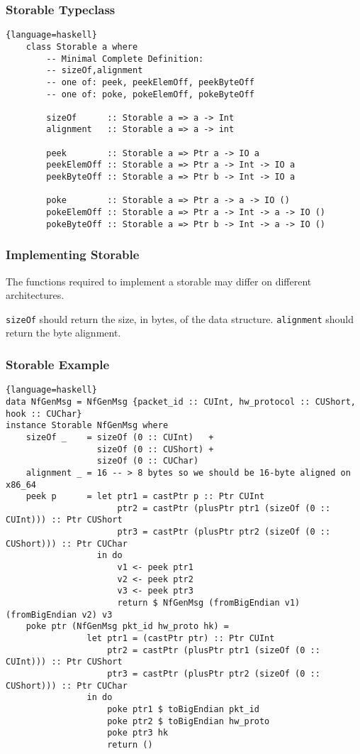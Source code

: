 \documentclass{beamer}
\begin{document}
\begin{frame}[fragile]
    \frametitle{Storable Typeclass}
    \begin{lstlisting}{language=haskell}
    class Storable a where
        -- Minimal Complete Definition:
        -- sizeOf,alignment
        -- one of: peek, peekElemOff, peekByteOff
        -- one of: poke, pokeElemOff, pokeByteOff

        sizeOf      :: Storable a => a -> Int
        alignment   :: Storable a => a -> int

        peek        :: Storable a => Ptr a -> IO a
        peekElemOff :: Storable a => Ptr a -> Int -> IO a
        peekByteOff :: Storable a => Ptr b -> Int -> IO a

        poke        :: Storable a => Ptr a -> a -> IO ()
        pokeElemOff :: Storable a => Ptr a -> Int -> a -> IO ()
        pokeByteOff :: Storable a => Ptr b -> Int -> a -> IO ()
    \end{lstlisting}
\end{frame}
\begin{frame}
    \frametitle{Implementing Storable}

    The functions required to implement a storable may differ on different
    architectures.

    {\tt sizeOf} should return the size, in bytes, of the data structure.
    {\tt alignment} should return the byte alignment.  
\end{frame}
\begin{frame}[fragile]
    \frametitle{Storable Example}
    \begin{lstlisting}{language=haskell}
data NfGenMsg = NfGenMsg {packet_id :: CUInt, hw_protocol :: CUShort, hook :: CUChar}
instance Storable NfGenMsg where
    sizeOf _    = sizeOf (0 :: CUInt)   +
                  sizeOf (0 :: CUShort) +
                  sizeOf (0 :: CUChar)
    alignment _ = 16 -- > 8 bytes so we should be 16-byte aligned on x86_64
    peek p      = let ptr1 = castPtr p :: Ptr CUInt
                      ptr2 = castPtr (plusPtr ptr1 (sizeOf (0 :: CUInt))) :: Ptr CUShort
                      ptr3 = castPtr (plusPtr ptr2 (sizeOf (0 :: CUShort))) :: Ptr CUChar
                  in do
                      v1 <- peek ptr1
                      v2 <- peek ptr2
                      v3 <- peek ptr3
                      return $ NfGenMsg (fromBigEndian v1) (fromBigEndian v2) v3
    poke ptr (NfGenMsg pkt_id hw_proto hk) =
                let ptr1 = (castPtr ptr) :: Ptr CUInt
                    ptr2 = castPtr (plusPtr ptr1 (sizeOf (0 :: CUInt))) :: Ptr CUShort
                    ptr3 = castPtr (plusPtr ptr2 (sizeOf (0 :: CUShort))) :: Ptr CUChar
                in do
                    poke ptr1 $ toBigEndian pkt_id
                    poke ptr2 $ toBigEndian hw_proto
                    poke ptr3 hk
                    return ()
    \end{lstlisting}
\end{frame}
\end{document}
